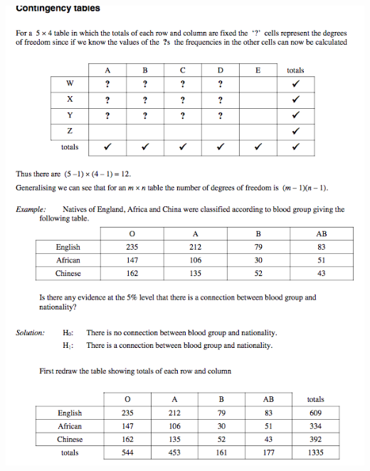 \documentclass[a4paper]{article}
\begin{document}
\begin{center}
	\includegraphics[scale=0.5]{img_S/19_eg5}
\end{center}
\end{document}
